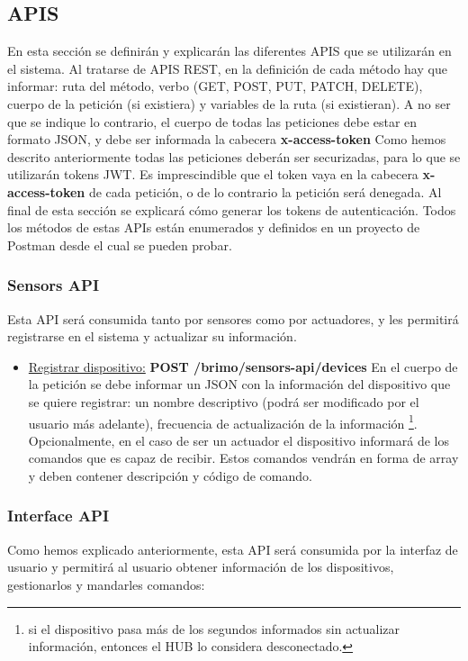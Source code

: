 \subsection{APIS}
En esta sección se definirán y explicarán las diferentes APIS que se utilizarán en el sistema. Al tratarse de APIS REST, en la definición
de cada método hay que informar: ruta del método, verbo (GET, POST, PUT, PATCH, DELETE), cuerpo de la petición (si existiera) y variables
de la ruta (si existieran). A no ser que se indique lo contrario, el cuerpo de todas las peticiones debe estar en formato JSON, y debe ser
informada la cabecera \textbf{x-access-token}
\newline
Como hemos descrito anteriormente todas las peticiones deberán ser securizadas, para lo que se utilizarán tokens JWT. Es imprescindible que el
token vaya en la cabecera \textbf{x-access-token} de cada petición, o de lo contrario la petición será denegada. Al final de esta sección se explicará cómo generar los tokens de autenticación.
\newline
Todos los métodos de estas APIs están enumerados y definidos en un proyecto de Postman desde el cual se pueden probar.
\newline
\subsubsection{Sensors API}
Esta API será consumida tanto por sensores como por actuadores, y les permitirá registrarse en el sistema y actualizar su información.

\begin{itemize}
\item \underline{Registrar dispositivo:} \textbf{POST /brimo/sensors-api/devices} En el cuerpo de la petición se debe informar un JSON con 
la información del dispositivo que se quiere registrar: un nombre descriptivo (podrá ser modificado por el usuario más adelante), frecuencia
de actualización de la información \footnote{si el dispositivo pasa más de los segundos informados sin actualizar información, entonces
el HUB lo considera desconectado.}. Opcionalmente, en el caso de ser un actuador el dispositivo informará de los comandos que es capaz
de recibir. Estos comandos vendrán en forma de array y deben contener descripción y código de comando.
\end{itemize}

\subsubsection{Interface API}
Como hemos explicado anteriormente, esta API será consumida por la interfaz de usuario y permitirá al usuario obtener información de los dispositivos,
gestionarlos y mandarles comandos:

